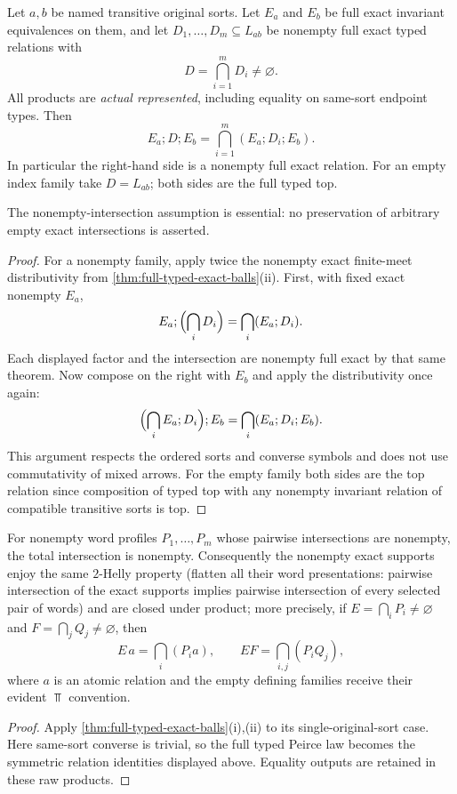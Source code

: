\begin{lemma}
\label{lem:full-typed-exact-saturation}
Let $a,b$ be named transitive original sorts.
Let $E_a$ and $E_b$ be full exact invariant
equivalences on them, and let
$D_1,\ldots,D_m\subseteq L_{ab}$ be
nonempty full exact typed relations with
\[
                    D=\bigcap_{i=1}^mD_i\ne\varnothing.
\]
All products are \emph{actual represented},
including equality on same-sort endpoint types.
Then
\[
 \boxed{\quad
 E_a;D;E_b=\bigcap_{i=1}^m(E_a;D_i;E_b).
 \quad}\tag{ES}\label{eq:foundational-exact-saturation}
\]
In particular the right-hand side is a
nonempty full exact relation. For an
empty index family take $D=L_{ab}$;
both sides are the full typed top.

The nonempty-intersection assumption is
essential: no preservation of arbitrary
empty exact intersections is asserted.
\end{lemma}
\begin{proof}
For a nonempty family, apply twice the
nonempty exact finite-meet distributivity
from \cref{thm:full-typed-exact-balls}(ii).
First, with fixed exact nonempty $E_a$,
\[
 E_a;\Bigl(\bigcap_iD_i\Bigr)
     =\bigcap_i(E_a;D_i).
\]
Each displayed factor and the intersection
are nonempty full exact by that same theorem.
Now compose on the right with $E_b$ and
apply the distributivity once again:
\[
 \Bigl(\bigcap_iE_a;D_i\Bigr);E_b
     =\bigcap_i(E_a;D_i;E_b).
\]
This argument respects the ordered
sorts and converse symbols and does not
use commutativity of mixed arrows.
For the empty family both sides are
the top relation since composition of
typed top with any nonempty invariant
relation of compatible transitive
sorts is top.
\end{proof}

\begin{lemma}
\label{lem:exact-product}
For nonempty word profiles $P_1,\dots,P_m$ whose pairwise
intersections are nonempty, the total intersection is nonempty.
Consequently the nonempty exact supports enjoy the same $2$-Helly
property (flatten all their word presentations: pairwise
intersection of the exact supports implies pairwise intersection
of every selected pair of words) and are closed under product; more precisely, if
$E=\bigcap_iP_i\ne\varnothing$ and
$F=\bigcap_jQ_j\ne\varnothing$, then
\[
 E\,a=\bigcap_i(P_i a),\qquad
 EF=\bigcap_{i,j}(P_iQ_j),
\]
where $a$ is an atomic relation and the empty defining families
receive their evident $\Top$ convention.
\end{lemma}
\begin{proof}
Apply \cref{thm:full-typed-exact-balls}(i),(ii) to its
single-original-sort case. Here same-sort converse is trivial,
so the full typed Peirce law becomes the symmetric relation
identities displayed above. Equality outputs are retained in
these raw products.
\end{proof}

